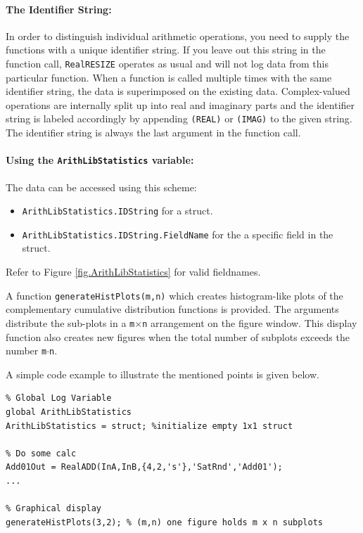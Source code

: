 \documentclass[a4paper,11pt]{article}
\begin{document}
\paragraph{The Identifier String:}
In order to distinguish individual arithmetic operations, you need to
supply the functions with a unique identifier string. If you leave out
this string in the function call, \texttt{RealRESIZE} operates as
usual and will not log data from this particular function.  When a
function is called multiple times with the same identifier string, the
data is superimposed on the existing data.  Complex-valued operations
are internally split up into real and imaginary parts and the
identifier string is labeled accordingly by appending \texttt{(REAL)}
or \texttt{(IMAG)} to the given string.  The identifier string is
always the last argument in the function call.

\paragraph{Using the \texttt{ArithLibStatistics} variable:}
The data can be accessed using this scheme:
\begin{itemize}
\item \texttt{ArithLibStatistics.IDString} for a struct.
\item \texttt{ArithLibStatistics.IDString.FieldName} for the a
  specific field in the struct.
\end{itemize}
Refer to Figure \ref{fig.ArithLibStatistics} for valid fieldnames.

A function \texttt{generateHistPlots(m,n)} which creates
histogram-like plots of the complementary cumulative distribution
functions is provided. The arguments distribute the sub-plots in a
\texttt{m}$\times$\texttt{n} arrangement on the figure window. This
display function also creates new figures when the total number of
subplots exceeds the number \texttt{m}$\cdot$\texttt{n}.

A simple code example to illustrate the mentioned points is given
below.
\begin{verbatim}
% Global Log Variable
global ArithLibStatistics
ArithLibStatistics = struct; %initialize empty 1x1 struct

% Do some calc
Add01Out = RealADD(InA,InB,{4,2,'s'},'SatRnd','Add01');
...

% Graphical display
generateHistPlots(3,2); % (m,n) one figure holds m x n subplots
\end{verbatim}
\end{document}
